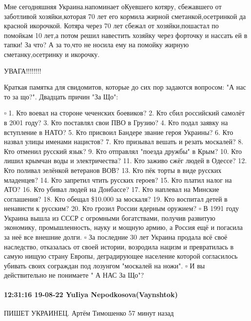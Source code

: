 Мне сегодняшняя Украина.напоминает оКуевшего котяру, сбежавшего от заботливой
хозяйки,которая 70 лет его кормила жирной сметанкой,осетринкой да красной
икорочкой. Котяра через 70 лет сбежал от хозяйки,пошастал по помойкам 10 лет,а
потом решил навестить хозяйку через форточку и нассать ей в тапки! За что? А за
то,что не носила ему на помойку жирную сметанку,осетринку и икорочку.

УВАГА!!!!!!!!

Краткая памятка для свидомитов, которые до сих пор задаются вопросом: "А нас то
за що?". Двадцать причин "За Що":

▫️
1. Кто воевал на стороне чеченских боевиков?
2. Кто сбил российский самолёт в 2001 году?
3. Кто поставлял свои ПВО в Грузию?
4. Кто подал заявку на вступление в НАТО?
5. Кто присвоил Бандере звание героя Украины?
6. Кто назвал улицы именами нацистов?
7. Кто призывал вешать и резать москалей?
8. Кто отменил русский язык?
9. Кто отправлял "поезда дружбы" в Крым?
10. Кто лишил крымчан воды и электричества?
11. Кто заживо сжёг людей в Одессе?
12. Кто поливал зелёнкой ветеранов ВОВ?
13. Кто пёк торты в виде русских младенцев?
14. Кто запретил чтить русских героев?
15. Кто платил налог на АТО?
16. Кто убивал людей на Донбассе?
17. Кто наплевал на Минские соглашения?
18. Кто обещал \$10.000 за москаля?
19. Кто воспитал детей в ненависти к русским?
20. Кто грозил России ядерным оружием?
▫️
В 1991 году Украина вышла из СССР с огромными богатствами, получив развитую экономику, промышленность, науку и мощную армию, а Россия ещё и погасила за неё все внешние долги.
▫️
За последние 30 лет Украина продала всё своё наследство, отказалась от своей истории, возродила нацизм и превратилась в самую нищую страну Европы, деградирующее население которой согласилось убивать своих сограждан под лозунгом "москалей на ножи".
▫️
И вы действительно не понимаете " А НАС За Що"?

\paragraph{12:31:16 19-08-22 YuIiya Nepodkosova(Vaynshtok)}

ПИШЕТ УКРАИНЕЦ. Артём Тимошенко
57 минут назад

